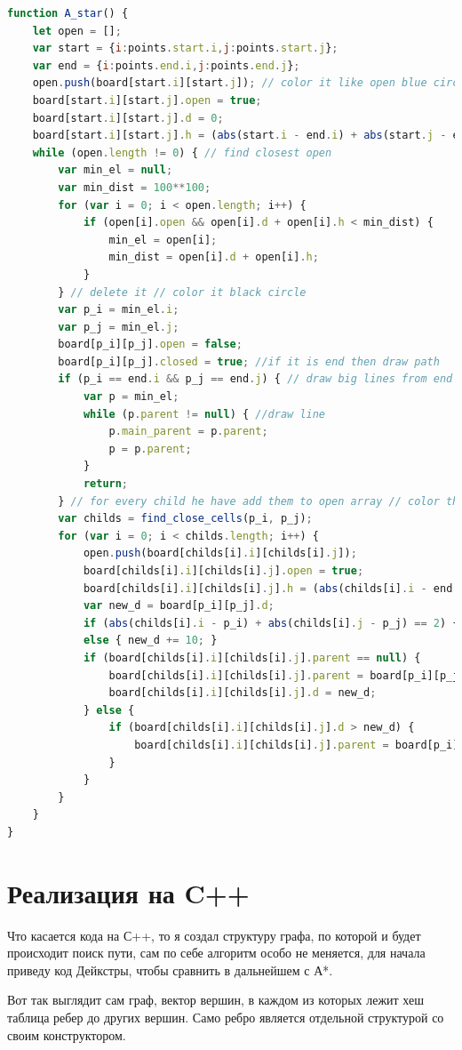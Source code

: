 \begin{lstlisting}[language=Javascript]
function A_star() {
	let open = [];
	var start = {i:points.start.i,j:points.start.j};
	var end = {i:points.end.i,j:points.end.j};
	open.push(board[start.i][start.j]); // color it like open blue circle
	board[start.i][start.j].open = true;
	board[start.i][start.j].d = 0;
	board[start.i][start.j].h = (abs(start.i - end.i) + abs(start.j - end.j)) * 10;
	while (open.length != 0) { // find closest open
		var min_el = null;
		var min_dist = 100**100;
		for (var i = 0; i < open.length; i++) {
			if (open[i].open && open[i].d + open[i].h < min_dist) {
				min_el = open[i];
				min_dist = open[i].d + open[i].h;
			}
		} // delete it // color it black circle
		var p_i = min_el.i;
		var p_j = min_el.j;
		board[p_i][p_j].open = false;
		board[p_i][p_j].closed = true; //if it is end then draw path
		if (p_i == end.i && p_j == end.j) { // draw big lines from end to start
			var p = min_el;
			while (p.parent != null) { //draw line
				p.main_parent = p.parent;
				p = p.parent;
			}
			return;
		} // for every child he have add them to open array // color them in blue circle
		var childs = find_close_cells(p_i, p_j);
		for (var i = 0; i < childs.length; i++) {
			open.push(board[childs[i].i][childs[i].j]);
			board[childs[i].i][childs[i].j].open = true;
			board[childs[i].i][childs[i].j].h = (abs(childs[i].i - end.i) + abs(childs[i].j - end.j)) * 10;
			var new_d = board[p_i][p_j].d;
			if (abs(childs[i].i - p_i) + abs(childs[i].j - p_j) == 2) { new_d += 14; } 
			else { new_d += 10; }
			if (board[childs[i].i][childs[i].j].parent == null) {
				board[childs[i].i][childs[i].j].parent = board[p_i][p_j];
				board[childs[i].i][childs[i].j].d = new_d;
			} else {
				if (board[childs[i].i][childs[i].j].d > new_d) {
					board[childs[i].i][childs[i].j].parent = board[p_i][p_j];
				}
			}
		}
	}
}
\end{lstlisting}

\pagebreak

\section{Реализация на C++}

Что касается кода на С++, то я создал структуру графа, по которой и будет происходит поиск пути, сам по себе алгоритм особо не меняется, для начала приведу код Дейкстры, чтобы сравнить в дальнейшем с А*.

Вот так выглядит сам граф, вектор вершин, в каждом из которых лежит хеш таблица ребер до других вершин. Само ребро является отдельной структурой со своим конструктором.


